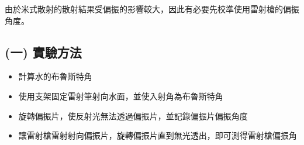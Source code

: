 由於米式散射的散射結果受偏振的影響較大，因此有必要先校準使用雷射槍的偏振角度。

\subsection*{(一) 實驗方法}
\begin{itemize}
    \item[1.] 計算水的布魯斯特角
    \item[2.] 使用支架固定雷射筆射向水面，並使入射角為布魯斯特角
    \item[3.] 旋轉偏振片，使反射光無法透過偏振片，並記錄偏振片偏振角度
    \item[4.] 讓雷射槍雷射射向偏振片，旋轉偏振片直到無光透出，即可測得雷射槍偏振角
\end{itemize}